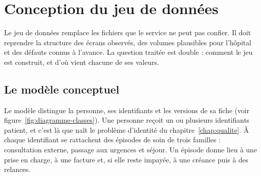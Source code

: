\chapter{Conception du jeu de données}\label{chap:jeu-de-donnees}

Le jeu de données remplace les fichiers que le service ne peut pas confier. Il doit reprendre la
structure des écrans observés, des volumes plausibles pour l'hôpital et des défauts connus à
l'avance. La question traitée est double : comment le jeu est construit, et d'où vient chacune de
ses valeurs.

\section{Le modèle conceptuel}

Le modèle distingue la personne, ses identifiants et les versions de sa fiche (voir
figure~\ref{fig:diagramme-classes}). Une personne reçoit un ou plusieurs identifiants patient, et
c'est là que naît le problème d'identité du chapitre~\ref{chap:qualite}. À chaque identifiant se
rattachent des épisodes de soin de trois familles : consultation externe, passage aux urgences et
séjour. Un épisode donne lieu à une prise en charge, à une facture et, si elle reste impayée, à une
créance puis à des relances.

